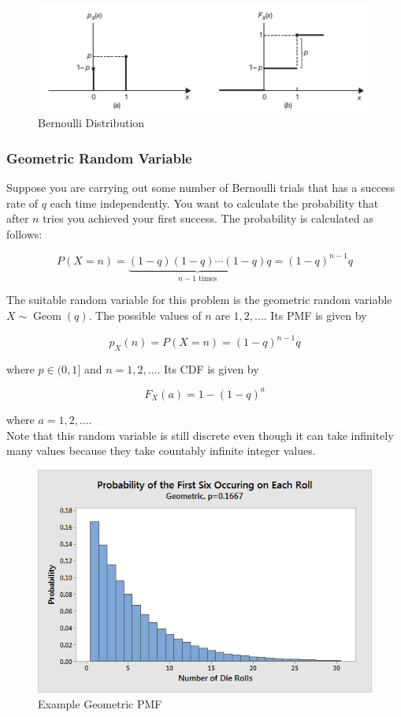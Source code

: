 \documentclass[12pt, a4paper]{article}
\newcommand{\Geom}{\operatorname{Geom}}
\begin{document}
\begin{figure}[H]
\centering
\includegraphics[width=120mm]{6.png}
\caption{Bernoulli Distribution}
\end{figure}

\subsubsection{Geometric Random Variable}

Suppose you are carrying out some number of Bernoulli trials that has a success rate of $q$ each time independently. You want to calculate the probability that after $n$ tries you achieved your first success. The probability is calculated as follows:

$$P(X=n)= \underbrace{ (1-q)(1-q) \cdots (1-q) }_{ \text{$n-1$ times} } q=(1-q)^{n-1} q$$

The suitable random variable for this problem is the geometric random variable $X \sim \Geom (q)$. The possible values of $n$ are $1, 2, \dots$. Its PMF is given by

$$p_X(n)=P(X=n)=(1-q)^{n-1} q$$

where $p\in(0,1]$ and $n=1, 2,\dots$. Its CDF is given by

$$F_X(a)=1-(1-q)^a$$

where $a=1, 2,\dots$. \\

Note that this random variable is still discrete even though it can take infinitely many values because they take countably infinite integer values.

\begin{figure}[H]
\centering
\includegraphics[width=120mm]{7.png}
\caption{Example Geometric PMF}
\end{figure}
\end{document}
